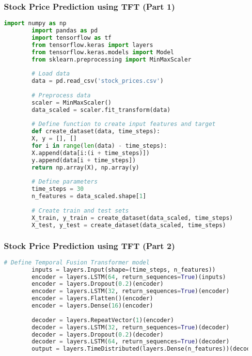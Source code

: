 	
\begin{frame}[fragile]
	\frametitle{Stock Price Prediction using TFT (Part 1)}
	
	\begin{lstlisting}[style=mystyle, language=Python, caption={Stock Price Prediction using TFT (Part 1)}]
		import numpy as np
		import pandas as pd
		import tensorflow as tf
		from tensorflow.keras import layers
		from tensorflow.keras.models import Model
		from sklearn.preprocessing import MinMaxScaler
		
		# Load data
		data = pd.read_csv('stock_prices.csv')
		
		# Preprocess data
		scaler = MinMaxScaler()
		data_scaled = scaler.fit_transform(data)
		
		# Define function to create input features and target
		def create_dataset(data, time_steps):
		X, y = [], []
		for i in range(len(data) - time_steps):
		X.append(data[i:(i + time_steps)])
		y.append(data[i + time_steps])
		return np.array(X), np.array(y)
		
		# Define parameters
		time_steps = 30
		n_features = data_scaled.shape[1]
		
		# Create train and test sets
		X_train, y_train = create_dataset(data_scaled, time_steps)
		X_test, y_test = create_dataset(data_scaled, time_steps)
	\end{lstlisting}
\end{frame}

\begin{frame}[fragile]
	\frametitle{Stock Price Prediction using TFT (Part 2)}
	
	\begin{lstlisting}[style=mystyle, language=Python, caption={Stock Price Prediction using TFT (Part 2)}]
		# Define Temporal Fusion Transformer model
		inputs = layers.Input(shape=(time_steps, n_features))
		encoder = layers.LSTM(64, return_sequences=True)(inputs)
		encoder = layers.Dropout(0.2)(encoder)
		encoder = layers.LSTM(32, return_sequences=True)(encoder)
		encoder = layers.Flatten()(encoder)
		encoder = layers.Dense(16)(encoder)
		
		decoder = layers.RepeatVector(1)(encoder)
		decoder = layers.LSTM(32, return_sequences=True)(decoder)
		decoder = layers.Dropout(0.2)(decoder)
		decoder = layers.LSTM(64, return_sequences=True)(decoder)
		output = layers.TimeDistributed(layers.Dense(n_features))(decoder)
	\end{lstlisting}
\end{frame}

